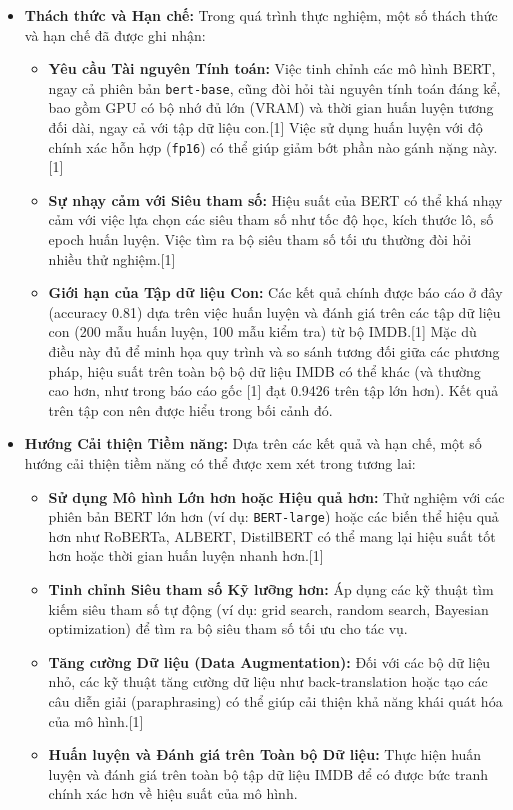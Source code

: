\begin{itemize}
    \item \textbf{Thách thức và Hạn chế:}
    Trong quá trình thực nghiệm, một số thách thức và hạn chế đã được ghi nhận:
    \begin{itemize}
        \item \textbf{Yêu cầu Tài nguyên Tính toán:} Việc tinh chỉnh các mô hình BERT, ngay cả phiên bản \texttt{bert-base}, cũng đòi hỏi tài nguyên tính toán đáng kể, bao gồm GPU có bộ nhớ đủ lớn (VRAM) và thời gian huấn luyện tương đối dài, ngay cả với tập dữ liệu con.[1] Việc sử dụng huấn luyện với độ chính xác hỗn hợp (\texttt{fp16}) có thể giúp giảm bớt phần nào gánh nặng này.[1]
        \item \textbf{Sự nhạy cảm với Siêu tham số:} Hiệu suất của BERT có thể khá nhạy cảm với việc lựa chọn các siêu tham số như tốc độ học, kích thước lô, số epoch huấn luyện. Việc tìm ra bộ siêu tham số tối ưu thường đòi hỏi nhiều thử nghiệm.[1]
        \item \textbf{Giới hạn của Tập dữ liệu Con:} Các kết quả chính được báo cáo ở đây (accuracy 0.81) dựa trên việc huấn luyện và đánh giá trên các tập dữ liệu con (200 mẫu huấn luyện, 100 mẫu kiểm tra) từ bộ IMDB.[1] Mặc dù điều này đủ để minh họa quy trình và so sánh tương đối giữa các phương pháp, hiệu suất trên toàn bộ bộ dữ liệu IMDB có thể khác (và thường cao hơn, như trong báo cáo gốc [1] đạt 0.9426 trên tập lớn hơn). Kết quả trên tập con nên được hiểu trong bối cảnh đó.
    \end{itemize}

    \item \textbf{Hướng Cải thiện Tiềm năng:}
    Dựa trên các kết quả và hạn chế, một số hướng cải thiện tiềm năng có thể được xem xét trong tương lai:
    \begin{itemize}
        \item \textbf{Sử dụng Mô hình Lớn hơn hoặc Hiệu quả hơn:} Thử nghiệm với các phiên bản BERT lớn hơn (ví dụ: \texttt{BERT-large}) hoặc các biến thể hiệu quả hơn như RoBERTa, ALBERT, DistilBERT có thể mang lại hiệu suất tốt hơn hoặc thời gian huấn luyện nhanh hơn.[1]
        \item \textbf{Tinh chỉnh Siêu tham số Kỹ lưỡng hơn:} Áp dụng các kỹ thuật tìm kiếm siêu tham số tự động (ví dụ: grid search, random search, Bayesian optimization) để tìm ra bộ siêu tham số tối ưu cho tác vụ.
        \item \textbf{Tăng cường Dữ liệu (Data Augmentation):} Đối với các bộ dữ liệu nhỏ, các kỹ thuật tăng cường dữ liệu như back-translation hoặc tạo các câu diễn giải (paraphrasing) có thể giúp cải thiện khả năng khái quát hóa của mô hình.[1]
        \item \textbf{Huấn luyện và Đánh giá trên Toàn bộ Dữ liệu:} Thực hiện huấn luyện và đánh giá trên toàn bộ tập dữ liệu IMDB để có được bức tranh chính xác hơn về hiệu suất của mô hình.
    \end{itemize}
\end{itemize}

